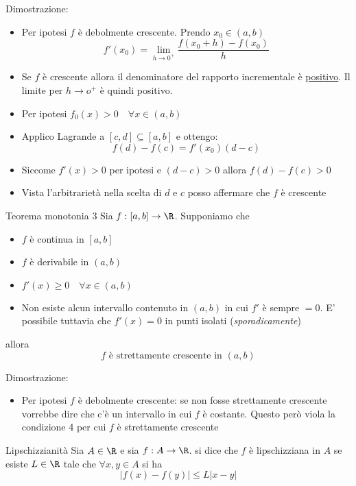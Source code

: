 Dimostrazione:
\begin{itemize}
	\item Per ipotesi $f$ è debolmente crescente. Prendo $x_0 \in  \left( a,b \right) $
	      \[
		      f'\left( x_0 \right) = \lim_{h \to 0^{+}} \frac{f\left( x_0+h \right) -f\left( x_0 \right)}{h}
	      \]
	\item Se $f$ è crescente allora il denominatore del rapporto incrementale è \underline{positivo}. Il limite per $h \to o^{+}$ è quindi positivo.
\end{itemize}
\hr
\begin{itemize}
	\item Per ipotesi $f_0\left( x \right) > 0 \quad  \forall x \in  \left( a,b \right) $
	\item Applico Lagrande a $\left[ c,d \right] \subseteq \left[ a,b \right] $ e ottengo:
	      \[
		      f\left( d \right) - f\left( c \right) =f'\left( x_0 \right) \left( d-c \right)
	      \]
	\item Siccome $f'\left( x \right) > 0$ per ipotesi e $\left( d-c \right) > 0$ allora $f\left( d \right) -f\left( c \right) > 0$
	\item Vista l'arbitrarietà nella scelta di $d$ e $c$ posso affermare che $f$ è crescente
\end{itemize}
\begin{teorema}{Teorema monotonia 3}
	Sia $f:\left[ a,b \right] \to \R$. Supponiamo che
	\begin{itemize}
		\item $f$ è continua in $\left[ a,b \right] $
		\item $f$ è derivabile in $ \left( a,b \right) $
		\item $f'\left( x \right)  \ge 0 \quad \forall x \in  \left( a,b \right) $
		\item Non esiste alcun intervallo contenuto in $\left( a,b \right) $ in cui $f'$ è sempre $=0$. E' possibile tuttavia che $f'\left( x \right) =0$ in punti isolati (\textit{sporadicamente})
	\end{itemize}
	allora
	\[
		f \text{ è strettamente crescente in } \left( a,b \right)
	\]
\end{teorema}

Dimostrazione:
\begin{itemize}
	\item Per ipotesi $f$ è debolmente crescente: se non fosse strettamente crescente vorrebbe dire che c'è un intervallo in cui $f$ è costante. Questo però viola la condizione 4 per cui $f$ è strettamente crescente
\end{itemize}
\begin{definizione}{Lipschizzianità}
	Sia $ A \in  \R$ e sia $ f: A \to \R$. si dice che $f$ è lipschizziana in $A$ se esiste $L \in  \R$ tale che $ \forall x, y \in  A$ si ha
	\[
		\left|f\left( x \right)  - f\left( y \right) \right| \le L \left| x-y\right|
	\]
\end{definizione}

